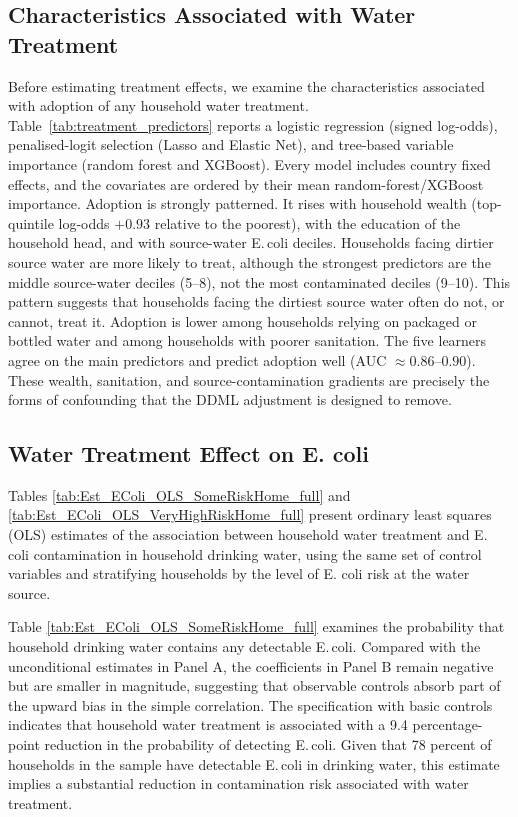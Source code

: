 \documentclass [11pt]{article}
\theoremstyle{plain}
\theoremstyle{definition}
\theoremstyle{remark}
\newcommand{\1}{\bm{1}}
\begin{document}
\subsection{Characteristics Associated with Water Treatment}\label{Lasso}

Before estimating treatment effects, we examine the characteristics associated with adoption of any household water treatment. Table~\ref{tab:treatment_predictors} reports a logistic regression (signed log-odds), penalised-logit selection (Lasso and Elastic Net), and tree-based variable importance (random forest and XGBoost). Every model includes country fixed effects, and the covariates are ordered by their mean random-forest/XGBoost importance. Adoption is strongly patterned. It rises with household wealth (top-quintile log-odds $+0.93$ relative to the poorest), with the education of the household head, and with source-water E.\,coli deciles. Households facing dirtier source water are more likely to treat, although the strongest predictors are the middle source-water deciles (5--8), not the most contaminated deciles (9--10). This pattern suggests that households facing the dirtiest source water often do not, or cannot, treat it. Adoption is lower among households relying on packaged or bottled water and among households with poorer sanitation. The five learners agree on the main predictors and predict adoption well (AUC $\approx 0.86$--$0.90$). These wealth, sanitation, and source-contamination gradients are precisely the forms of confounding that the DDML adjustment is designed to remove.



\subsection{Water Treatment Effect on E. coli}\label{OLS}

Tables \ref{tab:Est_EColi_OLS_SomeRiskHome_full} and \ref{tab:Est_EColi_OLS_VeryHighRiskHome_full} present ordinary least squares (OLS) estimates of the association between household water treatment and E. coli contamination in household drinking water, using the same set of control variables and stratifying households by the level of E. coli risk at the water source.

Table \ref{tab:Est_EColi_OLS_SomeRiskHome_full} examines the probability that household drinking water contains any detectable E.\,coli. Compared with the unconditional estimates in Panel A, the coefficients in Panel B remain negative but are smaller in magnitude, suggesting that observable controls absorb part of the upward bias in the simple correlation. The specification with basic controls indicates that household water treatment is associated with a 9.4 percentage-point reduction in the probability of detecting E.\,coli. Given that 78 percent of households in the sample have detectable E.\,coli in drinking water, this estimate implies a substantial reduction in contamination risk associated with water treatment.
\end{document}
